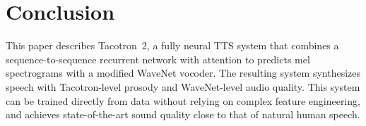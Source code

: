 \section{Conclusion}
\label{sec:conclusion}

This paper describes Tacotron~2, a fully neural
TTS system that combines a sequence-to-sequence recurrent network with attention
to predicts mel spectrograms with a modified WaveNet vocoder.  The resulting system synthesizes
speech with Tacotron-level prosody and WaveNet-level audio quality. This system
can be trained directly from data without relying on complex feature
engineering, and achieves state-of-the-art sound quality close to that of
natural human speech.
